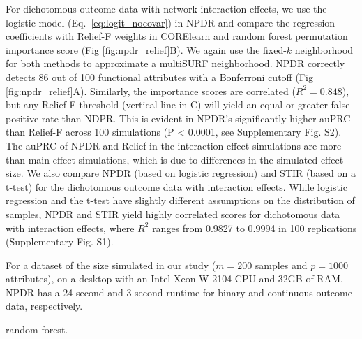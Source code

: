 \documentclass[10pt]{article}
\begin{document}
For dichotomous outcome data with network interaction effects, we use the logistic model (Eq.~\ref{eq:logit_nocovar}) in NPDR and compare the regression coefficients with Relief-F weights in CORElearn and random forest permutation importance score (Fig \ref{fig:npdr_relief}B).
We again use the fixed-$k$ neighborhood for both methods to approximate a multiSURF neighborhood.
NPDR correctly detects 86 out of 100 functional attributes with a Bonferroni cutoff (Fig \ref{fig:npdr_relief}A).
Similarly, the importance scores are correlated ($R^2 = 0.848$), but any Relief-F threshold (vertical line in C) will yield an equal or greater false positive rate than NDPR.
This is evident in NPDR's significantly higher auPRC than Relief-F across 100 simulations (P < 0.0001, see Supplementary Fig. S2).
The auPRC of NPDR and Relief in the interaction effect simulations are more than main effect simulations, which is due to differences in the simulated effect size. 
We also compare NPDR (based on logistic regression) and STIR (based on a t-test) for the dichotomous outcome data with interaction effects.
While logistic regression and the t-test have slightly different assumptions on the distribution of samples, NPDR and STIR yield highly correlated scores for dichotomous data with interaction effects, where $R^2$ ranges from 0.9827 to 0.9994 in 100 replications (Supplementary Fig. S1). 


For a dataset of the size simulated in our study ($m=200$ samples and $p=1000$ attributes), on a desktop with an Intel Xeon W-2104 CPU and 32GB of RAM, NPDR has a 24-second and 3-second runtime for binary and continuous outcome data, respectively.

random forest.
\end{document}
